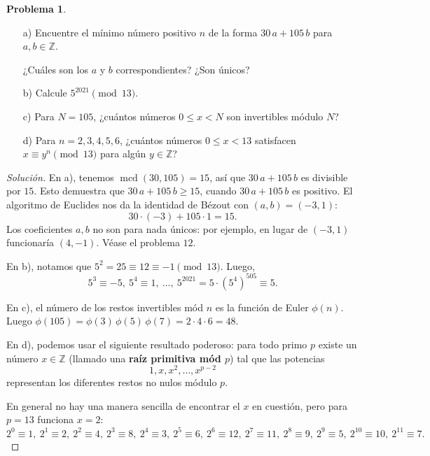 \documentclass{article}
\newcommand{\ZZ}{\mathbb{Z}}
\DeclareMathOperator{\mcd}{mcd}
\theoremstyle{definition}
\newtheorem{problema}{Problema}
\newenvironment{solucion}{\begin{proof}[Solución]\small}{\end{proof}}
\begin{document}
\setcounter{problema}{-1}
\begin{problema}
  ~
  \begin{enumerate}
  \item[a)] Encuentre el mínimo número positivo $n$ de la forma $30\,a + 105\,b$
    para $a,b \in \ZZ$.

    ¿Cuáles son los $a$ y $b$ correspondientes? ¿Son únicos?

  \item[b)] Calcule $5^{2021} \pmod{13}$.

  \item[c)] Para $N = 105$, ¿cuántos números $0 \le x < N$ son invertibles
    módulo $N$?

  \item[d)] Para $n = 2,3,4,5,6$, ¿cuántos números $0 \le x < 13$ satisfacen
    $x \equiv y^n \pmod{13}$ para algún $y \in \ZZ$?
  \end{enumerate}

  \ifdefined\solutions\begin{solucion}
    En a), tenemos $\mcd (30,105) = 15$, así que $30\,a + 105\,b$ es divisible
    por $15$. Esto demuestra que $30\,a + 105\,b \ge 15$, cuando $30\,a + 105\,b$
    es positivo. El algoritmo de Euclides nos da la identidad de Bézout con
    $(a,b) = (-3,1)$:
    $$30\cdot (-3) + 105\cdot 1 = 15.$$
    Los coeficientes $a,b$ no son para nada únicos: por ejemplo, en lugar de
    $(-3,1)$ funcionaría $(4,-1)$. Véase el problema $12$.

    \vspace{1em}

    En b), notamos que $5^2 = 25 \equiv 12 \equiv -1 \pmod{13}$. Luego,
    \[
      5^3 \equiv -5, ~
      5^4 \equiv 1, ~
      \ldots, ~
      5^{2021} = 5\cdot (5^4)^{505} \equiv 5.
    \]

    En c), el número de los restos invertibles mód $n$ es la función de Euler
    $\phi(n)$. Luego
    $\phi (105) = \phi(3)\,\phi(5)\,\phi(7) = 2\cdot 4\cdot 6 = 48$.

    \vspace{1em}

    En d), podemos usar el siguiente resultado poderoso: para todo primo $p$
    existe un número $x \in \ZZ$ (llamado una \textbf{raíz primitiva mód $p$})
    tal que las potencias
    $$1, x, x^2, \ldots, x^{p-2}$$
    representan los diferentes restos no nulos módulo $p$.

    En general no hay una manera sencilla de encontrar el $x$ en cuestión, pero
    para $p = 13$ funciona $x = 2$:
    \[
      2^0 \equiv 1, ~
      2^1 \equiv 2, ~
      2^2 \equiv 4, ~
      2^3 \equiv 8, ~
      2^4 \equiv 3, ~
      2^5 \equiv 6, ~
      2^6 \equiv 12, ~
      2^7 \equiv 11, ~
      2^8 \equiv 9, ~
      2^9 \equiv 5, ~
      2^{10} \equiv 10, ~
      2^{11} \equiv 7.
    \]


\end{solucion}
\end{problema}
\end{document}

